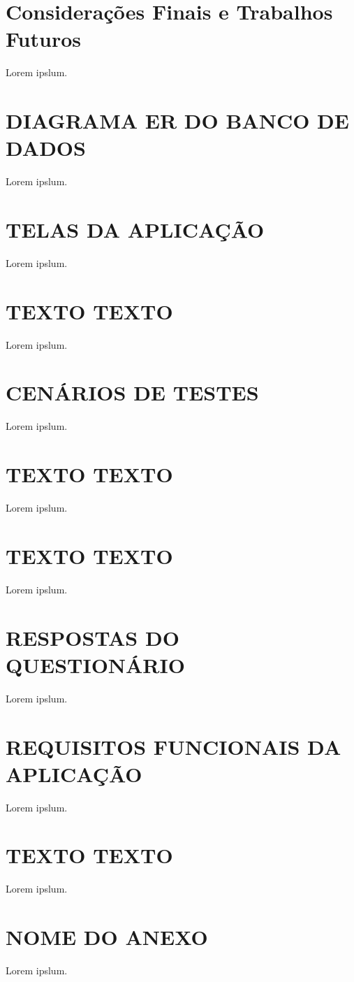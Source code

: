 \documentclass[english,brazilian]{UNISINOSartigo} %
\begin{document}
\section{Considerações Finais e Trabalhos Futuros}

Lorem ipslum.



\appendix
\section{DIAGRAMA ER DO BANCO DE DADOS}

Lorem ipslum.

\section{TELAS DA APLICAÇÃO}

Lorem ipslum.

\section{TEXTO TEXTO}

Lorem ipslum.

\section{CENÁRIOS DE TESTES}

Lorem ipslum.

\section{TEXTO TEXTO}

Lorem ipslum.

\section{TEXTO TEXTO}

Lorem ipslum.

\section{RESPOSTAS DO QUESTIONÁRIO}

Lorem ipslum.

\section{REQUISITOS FUNCIONAIS DA APLICAÇÃO}

Lorem ipslum.

\section{TEXTO TEXTO}

Lorem ipslum.

\annex
\section{NOME DO ANEXO}

Lorem ipslum.
\end{document}
